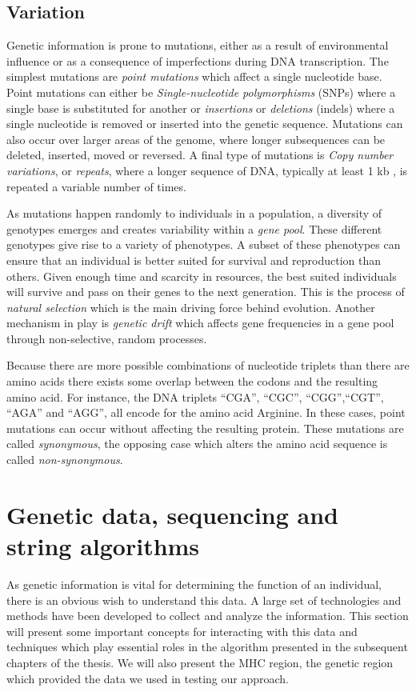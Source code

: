 \documentclass[thesis.tex]{subfiles}
\begin{document}
\subsection{Variation}
\label{sec:genetic_variation}
Genetic information is prone to mutations, either as a result of environmental influence or as a consequence of imperfections during DNA transcription. The simplest mutations are \textit{point mutations} which affect a single nucleotide base. Point mutations can either be \textit{Single-nucleotide polymorphisms} (SNPs) where a single base is substituted for another or \textit{insertions} or \textit{deletions} (indels) where a single nucleotide is removed or inserted into the genetic sequence. Mutations can also occur over larger areas of the genome, where longer subsequences can be deleted, inserted, moved or reversed. A final type of mutations is \textit{Copy number variations}, or \textit{repeats}, where a longer sequence of DNA, typically at least 1 kb \cite{copy_number_variation_new_insights_in_genome_diversity}, is repeated a variable number of times.\\
\par\noindent
As mutations happen randomly to individuals in a population, a diversity of genotypes emerges and creates variability within a \textit{gene pool}. These different genotypes give rise to a variety of phenotypes. A subset of these phenotypes can ensure that an individual is better suited for survival and reproduction than others. Given enough time and scarcity in resources, the best suited individuals will survive and pass on their genes to the next generation. This is the process of \textit{natural selection} which is the main driving force behind evolution. Another mechanism in play is \textit{genetic drift} which affects gene frequencies in a gene pool through non-selective, random processes. \\
\par\noindent
Because there are more possible combinations of nucleotide triplets than there are amino acids there exists some overlap between the codons and the resulting amino acid. For instance, the DNA triplets ``CGA'', ``CGC'', ``CGG'',``CGT'', ``AGA'' and ``AGG'', all encode for the amino acid Arginine. In these cases, point mutations can occur without affecting the resulting protein. These mutations are called \textit{synonymous}, the opposing case which alters the amino acid sequence is called \textit{non-synonymous}.
\section{Genetic data, sequencing and string algorithms}
As genetic information is vital for determining the function of an individual, there is an obvious wish to understand this data. A large set of technologies and methods have been developed to collect and analyze the information. This section will present some important concepts for interacting with this data and techniques which play essential roles in the algorithm presented in the subsequent chapters of the thesis. We will also present the MHC region, the genetic region which provided the data we used in testing our approach.
\end{document}
